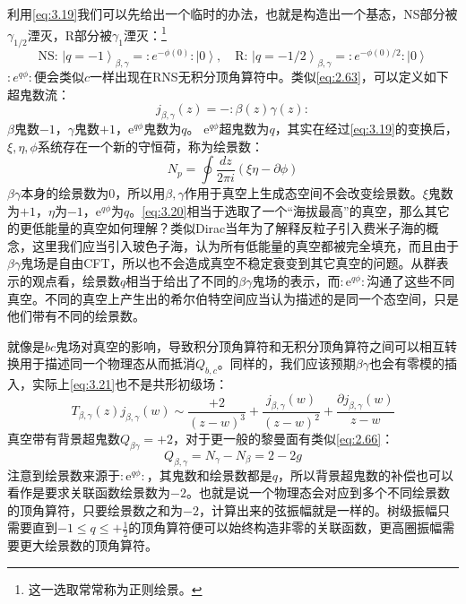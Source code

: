 利用\ref{eq:3.19}我们可以先给出一个临时的办法，也就是构造出一个基态，NS部分被$\gamma_{1/2}$湮灭，R部分被$\gamma_1$湮灭：\footnote{这一选取常常称为正则绘景。}
\begin{equation}
	\label{eq:3.20}
	\text{NS: }\left|q=-1\right\rangle_{\beta,\gamma}=:e^{-\phi(0)}:\left|0\right\rangle,\quad \text{R: }\left|q=-1/2\right\rangle_{\beta,\gamma}=:e^{-\phi(0)/2}:\left|0\right\rangle
\end{equation}
$:e^{q\phi}:$便会类似$c$一样出现在RNS无积分顶角算符中。类似\ref{eq:2.63}，可以定义如下超鬼数流：
\begin{equation}
	\label{eq:3.21}
	j_{\beta,\gamma}(z)=-:\beta(z)\gamma(z):
\end{equation}
$\beta$鬼数$-1$，$\gamma$鬼数$+1$，$\mathrm{e}^{q\phi}$鬼数为$q$。
$\mathrm{e}^{q\phi}$超鬼数为$q$，其实在经过\ref{eq:3.19}的变换后，$\xi,\eta,\phi$系统存在一个新的守恒荷，称为绘景数：
\begin{equation}
	N_p=\oint\frac{dz}{2\pi i}(\xi\eta-\partial\phi)
\end{equation}
$\beta\gamma$本身的绘景数为$0$，所以用$\beta,\gamma$作用于真空上生成态空间不会改变绘景数。$\xi$鬼数为$+1$，$\eta$为$-1$，$\mathrm{e}^{q\phi}$为$q$。\ref{eq:3.20}相当于选取了一个“海拔最高”的真空，那么其它的更低能量的真空如何理解？类似Dirac当年为了解释反粒子引入费米子海的概念，这里我们应当引入玻色子海，认为所有低能量的真空都被完全填充，而且由于$\beta\gamma$鬼场是自由CFT，所以也不会造成真空不稳定衰变到其它真空的问题。从群表示的观点看，绘景数$q$相当于给出了不同的$\beta\gamma$鬼场的表示，而$:\mathrm{e}^{q\phi}:$沟通了这些不同真空。不同的真空上产生出的希尔伯特空间应当认为描述的是同一个态空间，只是他们带有不同的绘景数。

就像是$bc$鬼场对真空的影响，导致积分顶角算符和无积分顶角算符之间可以相互转换用于描述同一个物理态从而抵消$Q_{b,c}$。同样的，我们应该预期$\beta\gamma$也会有零模的插入，实际上\ref{eq:3.21}也不是共形初级场：
\begin{equation}
	T_{\beta,\gamma}(z)j_{\beta,\gamma}(w)\sim\frac{+2}{(z-w)^3}+\frac{j_{\beta,\gamma}(w)}{(z-w)^2}+\frac{\partial j_{\beta,\gamma}(w)}{z-w}
\end{equation}
真空带有背景超鬼数$Q_{\beta\gamma}=+2$，对于更一般的黎曼面有类似\ref{eq:2.66}：
\begin{equation}
	Q_{\beta,\gamma} = N_{\gamma}-N_{\beta}=2-2g
\end{equation}
注意到绘景数来源于$:\mathrm{e}^{q\phi}:$，其鬼数和绘景数都是$q$，所以背景超鬼数的补偿也可以看作是要求关联函数绘景数为$-2$。也就是说一个物理态会对应到多个不同绘景数的顶角算符，只要绘景数之和为$-2$，计算出来的弦振幅就是一样的。树级振幅只需要直到$-1\leq q\leq+\frac{1}{2}$的顶角算符便可以始终构造非零的关联函数，更高圈振幅需要更大绘景数的顶角算符。
